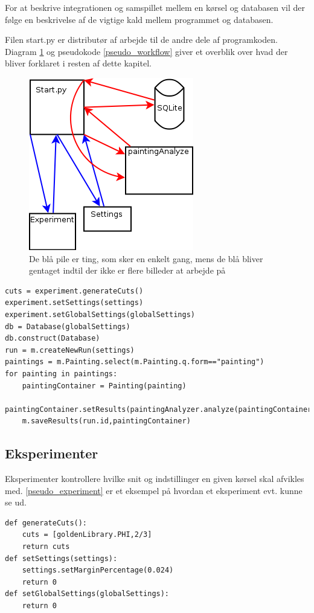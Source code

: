 {
{\sffamily
For at beskrive integrationen og samspillet mellem en kørsel og
databasen vil der følge en beskrivelse af de vigtige kald mellem 
programmet og databasen. 
}


Filen start.py er distributør af arbejde til de andre dele af programkoden.
Diagram \ref{start_workflow} og pseudokode \ref{pseudo_workflow} giver et overblik over hvad der bliver
forklaret i resten af dette kapitel. 
\begin{figure}[h!]
	\begin{center}
		\includegraphics[scale=0.5]{afsnit/implementation/billeder/workflow_start_py.png}
	\end{center}
	\caption{De blå pile er ting, som sker en enkelt gang, mens de blå
	\label{start_workflow}
	bliver gentaget indtil der ikke er flere billeder at arbejde på}
\end{figure}
\begin{lstlisting}[caption={Pseudokode for
start},frame=tb,label={pseudo_workflow}]
cuts = experiment.generateCuts()
experiment.setSettings(settings)
experiment.setGlobalSettings(globalSettings)
db = Database(globalSettings)
db.construct(Database)
run = m.createNewRun(settings)
paintings = m.Painting.select(m.Painting.q.form=="painting")
for painting in paintings:
	paintingContainer = Painting(painting)
	paintingContainer.setResults(paintingAnalyzer.analyze(paintingContainer,settings))
	m.saveResults(run.id,paintingContainer)
\end{lstlisting}
\subsection{Eksperimenter}
Eksperimenter kontrollere hvilke snit og indstillinger en given kørsel
skal afvikles med.  \ref{pseudo_experiment} er et eksempel
på hvordan et eksperiment evt. kunne se ud.
\begin{lstlisting}[caption={Pseudokode for et
experiment, som checker på $\varPhi$ og $\frac{2}{3}$},frame=tb,label={pseudo_experiment}]
def generateCuts():
	cuts = [goldenLibrary.PHI,2/3]
	return cuts
def setSettings(settings):
	settings.setMarginPercentage(0.024)
	return 0
def setGlobalSettings(globalSettings):
	return 0
\end{lstlisting}
}
